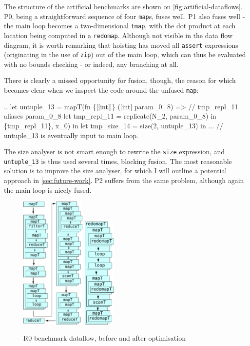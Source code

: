 The structure of the artificial benchmarks are shown on
\cref{fig:artificial-dataflows}.  P0, being a straightforward sequence
of four \texttt{map}s, fuses well.  P1 also fuses well - the main loop
becomes a two-dimensional \texttt{tmap}, with the dot product at each
location being computed in a \texttt{redomap}.  Although not visible
in the data flow diagram, it is worth remarking that hoisting has
moved all \texttt{assert} expressions (originating in the use of
\texttt{zip}) out of the main loop, which can thus be evaluated with
no bounds checking - or indeed, any branching at all.

There is clearly a missed opportunity for fusion, though, the reason
for which becomes clear when we inspect the code around the unfused
\texttt{map}:
\begin{colorcode}
..
let {untuple_13} =
  mapT(fn \{[[int]]\} ([int] param_0_8) =>
         // tmp_repl_11 aliases param_0_8
         let tmp_repl_11 = replicate(N_2, param_0_8) in
         \{tmp_repl_11\},
       x_0) in
let tmp_size_14 = size(2, untuple_13) in
... // untuple_13 is eventually input to main loop.
\end{colorcode}
The size analyser is not smart enough to rewrite the \texttt{size}
expression, and \texttt{untuple\_13} is thus used several times,
blocking fusion.  The most reasonable solution is to improve the size
analyser, for which I will outline a potential approach in
\cref{sec:future-work}.  P2 suffers from the same problem, although
again the main loop is nicely fused.

\begin{figure}
\begin{center}
\includegraphics[width=3.2cm]{img/PricingLexiFi-unfused.pdf}
\hspace{1cm}
\includegraphics[width=1.6cm]{img/PricingLexiFi-fused.pdf}
\end{center}
\caption{R0 benchmark dataflow, before and after optimisation}
\label{fig:r0-dataflow}
\end{figure}

